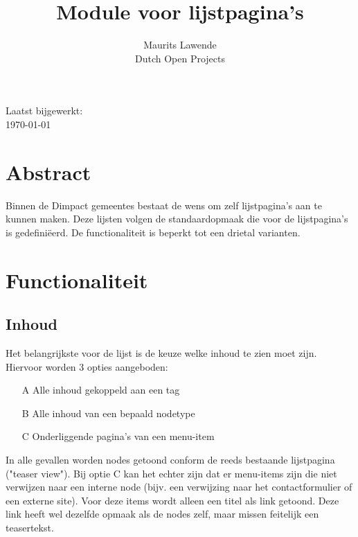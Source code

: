 \documentclass{article}
\begin{document}
\title{Module voor lijstpagina's}
\date{}
\author{Maurits Lawende \\ Dutch Open Projects}

\maketitle
\begin{center}
Laatst bijgewerkt: \\ \ddmmyyyydate \today
\end{center}

\renewcommand*\contentsname{Inhoudsopgave}
\tableofcontents
\pagebreak

\section{Abstract}

Binnen de Dimpact gemeentes bestaat de wens om zelf lijstpagina's aan te kunnen maken. Deze lijsten volgen de standaardopmaak die voor de lijstpagina's is gedefini\"{e}erd. De functionaliteit is beperkt tot een drietal varianten.

\section{Functionaliteit}\label{functionaliteit}

\subsection{Inhoud}\label{inhoud}
Het belangrijkste voor de lijst is de keuze welke inhoud te zien moet zijn. Hiervoor worden 3 opties aangeboden:
\begin{enumerate}
\item[A] Alle inhoud gekoppeld aan een tag
\item[B] Alle inhoud van een bepaald nodetype
\item[C] Onderliggende pagina's van een menu-item
\end{enumerate}
In alle gevallen worden nodes getoond conform de reeds bestaande lijstpagina ("teaser view"). Bij optie C kan het echter zijn dat er menu-items zijn die niet verwijzen naar een interne node (bijv. een verwijzing naar het contactformulier of een externe site). Voor deze items wordt alleen een titel als link getoond. Deze link heeft wel dezelfde opmaak als de nodes zelf, maar missen feitelijk een teasertekst.
\end{document}
